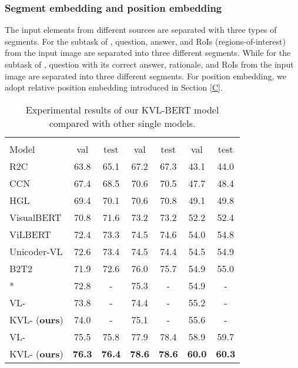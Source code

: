 \documentclass[conference]{IEEEtran}
\begin{document}
\subsubsection{Segment embedding and position embedding}
The input elements from different sources are separated with three types of segments. For the subtask of , question, answer, and RoIs (regions-of-interest) from the input image are separated into three different segments. While for the subtask of , question with its correct answer, rationale, and RoIs from the input image are separated into three different segments. For position embedding, we adopt relative position embedding introduced in Section \ref{C}. 

\begin{table*}[htp]
\setlength{\abovecaptionskip}{0pt}
\setlength{\belowcaptionskip}{10pt}
\caption{Experimental results of our KVL-BERT model compared with other single models.}
\centering
\begin{tabular}{l|cccccc}
\hline
 & \multicolumn{2}{c}{} & \multicolumn{2}{c}{} & \multicolumn{2}{c}{} \\
 Model& val &test&val&test&val&test\\
  \hline
R2C \cite{b10} & 63.8 & 65.1 & 67.2 & 67.3& 43.1 &44.0\\  
CCN \cite{b17} &67.4 & 68.5 & 70.6 & 70.5 & 47.7 & 48.4\\
HGL \cite{b18} & 69.4&	70.1&	70.6&	70.8	&49.1&	49.8 \\

\hline
VisualBERT \cite{b12} &70.8&	71.6	&73.2&	73.2&	52.2	&52.4\\
ViLBERT \cite{b13} &72.4	&73.3&	74.5&	74.6	&54.0&	54.8\\
Unicoder-VL \cite{b19} & 72.6	&73.4	&74.5&	74.4	&54.5&	54.9\\
B2T2 \cite{b15} & 71.9	&72.6	&76.0&	75.7	&54.9&	55.0\\
* \cite{b20} & 72.8 & - & 75.3 & - & 54.9 & - \\

\hline 
VL- \cite{b14} & 73.8 & - & 74.4 & - & 55.2 & - \\
KVL-  (\textbf{ours}) &74.0 & - & 75.1 & - & 55.6& - \\
VL- \cite{b14} & 75.5 & 75.8 & 77.9 &78.4 & 58.9 & 59.7 \\
KVL-  (\textbf{ours}) &\textbf{76.3}  & \textbf{76.4}&\textbf{78.6}  & \textbf{78.6} &\textbf{60.0}  & \textbf{60.3} \\
\hline
\end{tabular}
\label{tab2}
\end{table*}
\end{document}
